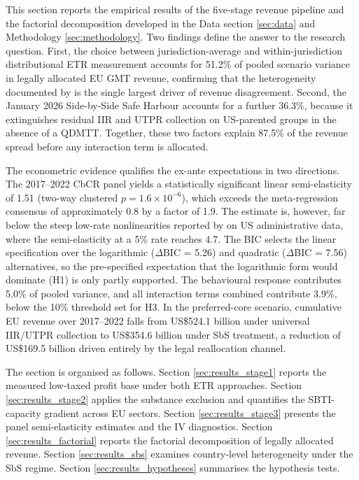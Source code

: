\documentclass[11pt,a4paper]{article}
\begin{document}
This section reports the empirical results of the five-stage revenue pipeline and the factorial decomposition developed in the Data section \ref{sec:data} and Methodology \ref{sec:methodology}. Two findings define the answer to the research question. First, the choice between jurisdiction-average and within-jurisdiction distributional ETR measurement accounts for 51.2\% of pooled scenario variance in legally allocated EU GMT revenue, confirming that the heterogeneity documented by \citet{hugger2026} is the single largest driver of revenue disagreement. Second, the January 2026 Side-by-Side Safe Harbour accounts for a further 36.3\%, because it extinguishes residual IIR and UTPR collection on US-parented groups in the absence of a QDMTT. Together, these two factors explain 87.5\% of the revenue spread before any interaction term is allocated.

The econometric evidence qualifies the ex-ante expectations in two directions. The 2017--2022 CbCR panel yields a statistically significant linear semi-elasticity of 1.51 (two-way clustered $p = 1.6 \times 10^{-6}$), which exceeds the meta-regression consensus of approximately 0.8 \citep{heckemeyer2017} by a factor of 1.9. The estimate is, however, far below the steep low-rate nonlinearities reported by \citet{dowd2017} on US administrative data, where the semi-elasticity at a 5\% rate reaches 4.7. The BIC selects the linear specification over the logarithmic ($\Delta$BIC = 5.26) and quadratic ($\Delta$BIC = 7.56) alternatives, so the pre-specified expectation that the logarithmic form would dominate (H1) is only partly supported. The behavioural response contributes 5.0\% of pooled variance, and all interaction terms combined contribute 3.9\%, below the 10\% threshold set for H3. In the preferred-core scenario, cumulative EU revenue over 2017--2022 falls from US\$524.1 billion under universal IIR/UTPR collection to US\$354.6 billion under SbS treatment, a reduction of US\$169.5 billion driven entirely by the legal reallocation channel.

The section is organised as follows. Section \ref{sec:results_stage1} reports the measured low-taxed profit base under both ETR approaches. Section \ref{sec:results_stage2} applies the substance exclusion and quantifies the SBTI-capacity gradient across EU sectors. Section \ref{sec:results_stage3} presents the panel semi-elasticity estimates and the IV diagnostics. Section \ref{sec:results_factorial} reports the factorial decomposition of legally allocated revenue. Section \ref{sec:results_sbs} examines country-level heterogeneity under the SbS regime. Section \ref{sec:results_hypotheses} summarises the hypothesis tests.
\end{document}
